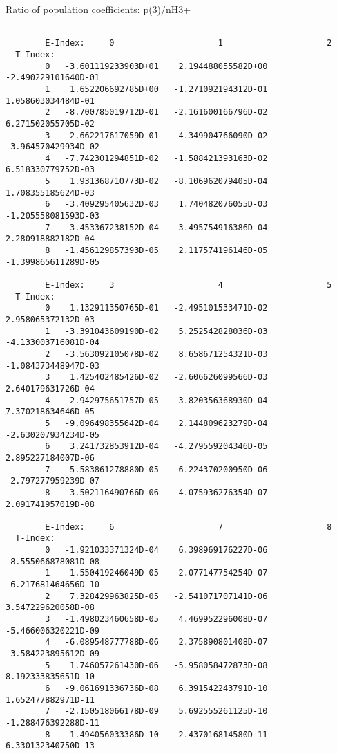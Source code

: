 \documentclass[12pt,dvipdfmx]{article}
\begin{document}
{ Ratio of population coefficients: p(3)/nH3+

\begin{small}\begin{verbatim}

        E-Index:     0                     1                     2
  T-Index:
        0   -3.601119233903D+01    2.194488055582D+00   -2.490229101640D-01
        1    1.652206692785D+00   -1.271092194312D-01    1.058603034484D-01
        2   -8.700785019712D-01   -2.161600166796D-02    6.271502055705D-02
        3    2.662217617059D-01    4.349904766090D-02   -3.964570429934D-02
        4   -7.742301294851D-02   -1.588421393163D-02    6.518330779752D-03
        5    1.931368710773D-02   -8.106962079405D-04    1.708355185624D-03
        6   -3.409295405632D-03    1.740482076055D-03   -1.205558081593D-03
        7    3.453367238152D-04   -3.495754916386D-04    2.280918882182D-04
        8   -1.456129857393D-05    2.117574196146D-05   -1.399865611289D-05

        E-Index:     3                     4                     5
  T-Index:
        0    1.132911350765D-01   -2.495101533471D-02    2.958065372132D-03
        1   -3.391043609190D-02    5.252542828036D-03   -4.133003716081D-04
        2   -3.563092105078D-02    8.658671254321D-03   -1.084373448947D-03
        3    1.425402485426D-02   -2.606626099566D-03    2.640179631726D-04
        4    2.942975651757D-05   -3.820356368930D-04    7.370218634646D-05
        5   -9.096498355642D-04    2.144809623279D-04   -2.630207934234D-05
        6    3.241732853912D-04   -4.279559204346D-05    2.895227184007D-06
        7   -5.583861278880D-05    6.224370200950D-06   -2.797277959239D-07
        8    3.502116490766D-06   -4.075936276354D-07    2.091741957019D-08

        E-Index:     6                     7                     8
  T-Index:
        0   -1.921033371324D-04    6.398969176227D-06   -8.555066878081D-08
        1    1.550419246049D-05   -2.077147754254D-07   -6.217681464656D-10
        2    7.328429963825D-05   -2.541071707141D-06    3.547229620058D-08
        3   -1.498023460658D-05    4.469952296008D-07   -5.466006320221D-09
        4   -6.089548777788D-06    2.375890801408D-07   -3.584223895612D-09
        5    1.746057261430D-06   -5.958058472873D-08    8.192333835651D-10
        6   -9.061691336736D-08    6.391542243791D-10    1.652477882971D-11
        7   -2.150518066178D-09    5.692555261125D-10   -1.288476392288D-11
        8   -1.494056033386D-10   -2.437016814580D-11    6.330132340750D-13


\end{verbatim}
\end{small}}
\end{document}
